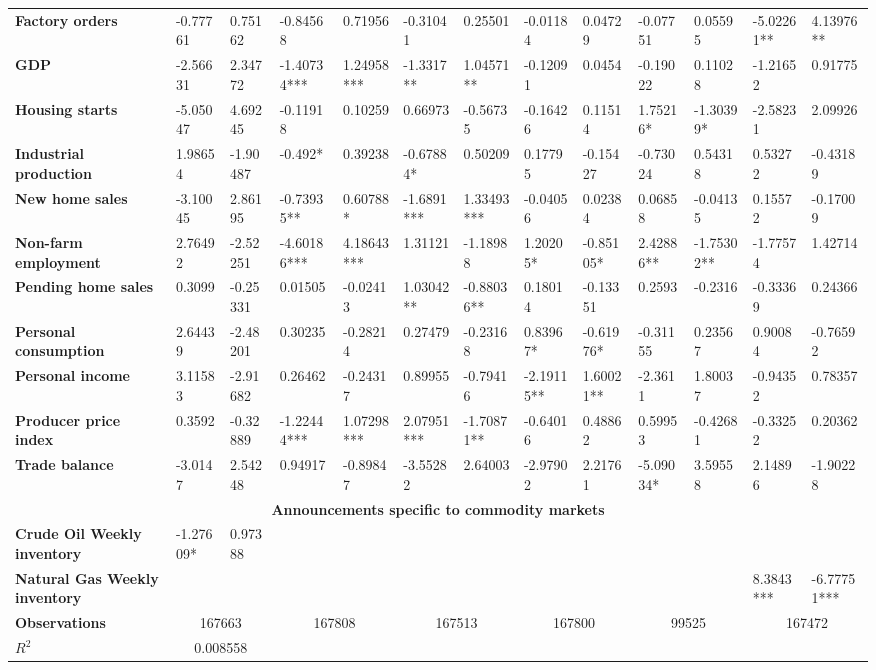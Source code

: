 \begin{sidewaystable}
{\begin{tabular}{@{}lllllllllllll@{}}
\textbf{Factory orders}& -0.77761 & 0.75162 & -0.84568 & 0.71956 & -0.31041 & 0.25501 & -0.01184 & 0.04729 & -0.07751 & 0.05595 & -5.02261** & 4.13976** \\ \textbf{GDP}& -2.56631 & 2.34772 & -1.40734***& 1.24958***& -1.3317** & 1.04571** & -0.12091 & 0.0454 & -0.19022 & 0.11028 & -1.21652 & 0.91775 \\ \textbf{Housing starts}& -5.05047 & 4.69245 & -0.11918 & 0.10259 & 0.66973 & -0.56735 & -0.16426 & 0.11514 & 1.75216* & -1.30399* & -2.58231 & 2.09926 \\ \textbf{Industrial production}& 1.98654 & -1.90487 & -0.492* & 0.39238 & -0.67884* & 0.50209 & 0.17795 & -0.15427 & -0.73024 & 0.54318 & 0.53272 & -0.43189 \\ \textbf{New home sales}& -3.10045 & 2.86195 & -0.73935** & 0.60788* & -1.6891*** & 1.33493*** & -0.04056 & 0.02384 & 0.06858 & -0.04135 & 0.15572 & -0.17009 \\ \textbf{Non-farm employment}& 2.76492 & -2.52251 & -4.60186***& 4.18643***& 1.31121 & -1.18988 & 1.20205* & -0.85105* & 2.42886** & -1.75302** & -1.77574 & 1.42714 \\ \textbf{Pending home sales}& 0.3099 & -0.25331 & 0.01505 & -0.02413 & 1.03042** & -0.88036** & 0.18014 & -0.13351 & 0.2593 & -0.2316 & -0.33369 & 0.24366 \\ \textbf{Personal consumption}& 2.64439 & -2.48201 & 0.30235 & -0.28214 & 0.27479 & -0.23168 & 0.83967* & -0.61976* & -0.31155 & 0.23567 & 0.90084 & -0.76592 \\ \textbf{Personal income}& 3.11583 & -2.91682 & 0.26462 & -0.24317 & 0.89955 & -0.79416 & -2.19115** & 1.60021** & -2.3611 & 1.80037 & -0.94352 & 0.78357 \\ \textbf{Producer price index}& 0.3592 & -0.32889 & -1.22444***& 1.07298***& 2.07951*** & -1.70871** & -0.64016 & 0.48862 & 0.59953 & -0.42681 & -0.33252 & 0.20362 \\ \textbf{Trade balance}& -3.0147 & 2.54248 & 0.94917 & -0.89847 & -3.55282 & 2.64003 & -2.97902 & 2.21761 & -5.09034* & 3.59558 & 2.14896 & -1.90228 \\  \midrule \multicolumn{13}{c}{\textbf{Announcements specific to commodity markets}} \\ \midrule \textbf{Crude Oil Weekly inventory}& -1.27609* & 0.97388 &  &  &  &  &  &  &  &  &  &  \\ \textbf{Natural Gas Weekly inventory}&  &  &  &  &  &  &  &  &  &  & 8.3843*** & -6.77751*** \\  \midrule \textbf{Observations}             &\multicolumn{2}{c}{ 167663 }                                                 & \multicolumn{2}{c}{ 167808 }                                                 & \multicolumn{2}{c}{ 167513 }                                                 & \multicolumn{2}{c}{ 167800 }                                                 & \multicolumn{2}{c}{ 99525 }                                                   & \multicolumn{2}{c}{ 167472 }                                                 \\ \textbf{$R^2$}             &\multicolumn{2}{c}{ 0.008558 }                                                 & 
\end{tabular}}
\end{sidewaystable}

